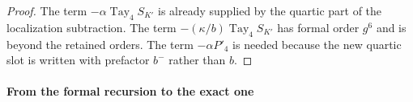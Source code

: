 \documentclass[11pt]{article}
\newcommand{\tr}{\operatorname{Tr}}
\newcommand{\Tay}{\operatorname{Tay}}
\newcommand{\Loc}{\operatorname{Loc}}
\numberwithin{equation}{section}
\theoremstyle{definition}
\theoremstyle{plain}
\begin{document}
\begin{proof}

The term $-\alpha \Tay_4 S_{K'}$ is already supplied by the
quartic part of the localization subtraction.
The term $-(\kappa/b)\Tay_4 S_{K'}$ has formal order $g^6$
and is beyond the retained orders.
The term $-\alpha P'_4$ is needed because the
new quartic slot is written with prefactor $b^-$ rather than $b$.
\end{proof}

\paragraph{From the formal recursion to the exact one}
\end{document}
